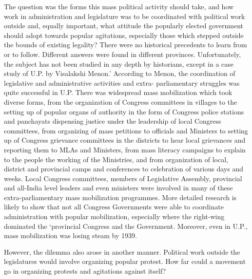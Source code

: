 The question was the forms this mass political activity should take, and how work in administration and legislature was to be coordinated with political work outside and, equally important, what attitude the popularly elected government should adopt towards popular agitations, especially those which stepped outside the bounds of existing legality? There were no historical precedents to learn from or to follow. Different answers were found in different provinces. Unfortunately, the subject has not been studied in any depth by historians, except in a case study of U.P. by Visalakshi Menon.' According to Menon, the coordination of legislative and administrative activities and extra- parliamentary struggles was quite successful in U.P. There was widespread mass mobilization which took diverse forms, from the organization of Congress committees in villages to the setting up of popular organs of authority in the form of Congress police stations and panchayats dispensing justice under the leadership of local Congress committees, from organizing of mass petitions to officials and Ministers to setting up of Congress grievance committees in the districts to hear local grievances and reporting them to MLAs and Ministers, from mass literacy campaigns to explain to the people the working of the Ministries, and from organization of local, district and provincial camps and conferences to celebration of various days and weeks. Local Congress committees, members of Legislative Assembly, provincial and all-India level leaders and even ministers were involved in many of these extra-parliamentary mass mobilization programmes. More detailed research is likely to show that not all Congress Governments were able to coordinate administration with popular mobilization, especially where the right-wing dominated the `provincial Congress and the Government. Moreover, even in U.P., mass mobilization was losing steam by 1939. 

However, the dilemma also arose in another manner. Political work outside the legislatures would involve organizing popular protest. How far could a movement go in organizing protests and agitations against itself? 

